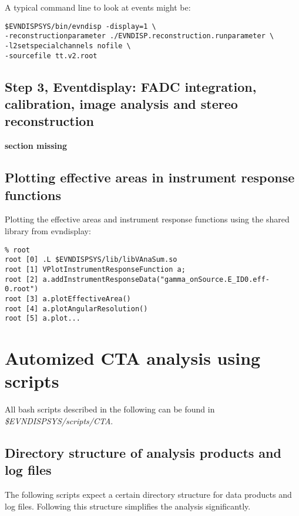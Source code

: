 \documentclass[titlepage,a4paper,twoside,11pt]{report}
\begin{document}
A typical command line to look at events might be:

\begin{lstlisting}
$EVNDISPSYS/bin/evndisp -display=1 \
-reconstructionparameter ./EVNDISP.reconstruction.runparameter \
-l2setspecialchannels nofile \
-sourcefile tt.v2.root 
\end{lstlisting}

\subsection{Step 3, Eventdisplay: FADC integration, calibration, image analysis and stereo reconstruction}

{\bf section missing}


\subsection{Plotting effective areas in instrument response functions}
\label{SEC.PLOTEFFAREA}

Plotting the effective areas and instrument response functions using
the shared library from evndisplay: 

\begin{lstlisting}
% root
root [0] .L $EVNDISPSYS/lib/libVAnaSum.so
root [1] VPlotInstrumentResponseFunction a;
root [2] a.addInstrumentResponseData("gamma_onSource.E_ID0.eff-0.root")
root [3] a.plotEffectiveArea()
root [4] a.plotAngularResolution()
root [5] a.plot...
\end{lstlisting}

\section{Automized CTA analysis using scripts}
\label{SECTION.CTASCRIPTANALYSIS}

All bash scripts described in the following can be found in {\it \$EVNDISPSYS/scripts/CTA}.

\subsection{Directory structure of analysis products and log files}

The following scripts expect a certain directory structure for data products and log files.
Following this structure simplifies the analysis significantly.
\end{document}

